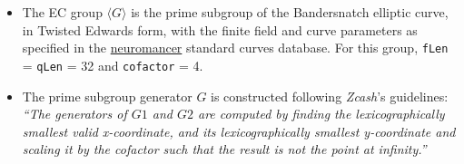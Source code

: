 \documentclass[
]{article}
\begin{document}
\begin{itemize}
\item
  The EC group \(\langle G \rangle\) is the prime subgroup of the
  Bandersnatch elliptic curve, in Twisted Edwards form, with the finite
  field and curve parameters as specified in the
  \href{https://neuromancer.sk/std/bls/Bandersnatch}{neuromancer}
  standard curves database. For this group, \texttt{fLen} =
  \texttt{qLen} = 32 and \texttt{cofactor} = 4.
\item
  The prime subgroup generator \(G\) is constructed following
  \emph{Zcash}'s guidelines: \emph{``The generators of \(G1\) and \(G2\)
  are computed by finding the lexicographically smallest valid
  x-coordinate, and its lexicographically smallest y-coordinate and
  scaling it by the cofactor such that the result is not the point at
  infinity.''}


\end{itemize}
\end{document}

